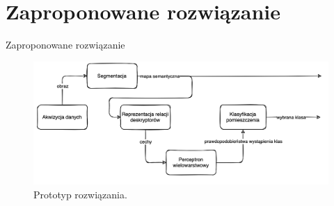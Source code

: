 \documentclass[10pt]{beamer}
\begin{document}
\section[Zaproponowane rozwiązanie]{Zaproponowane rozwiązanie}
\begin{frame}{Zaproponowane rozwiązanie}
    
    \begin{figure}
        \includegraphics[width=\textwidth]{images/own-solution.png}
        \caption{Prototyp rozwiązania.}
    \end{figure}
    
\end{frame}
\end{document}
